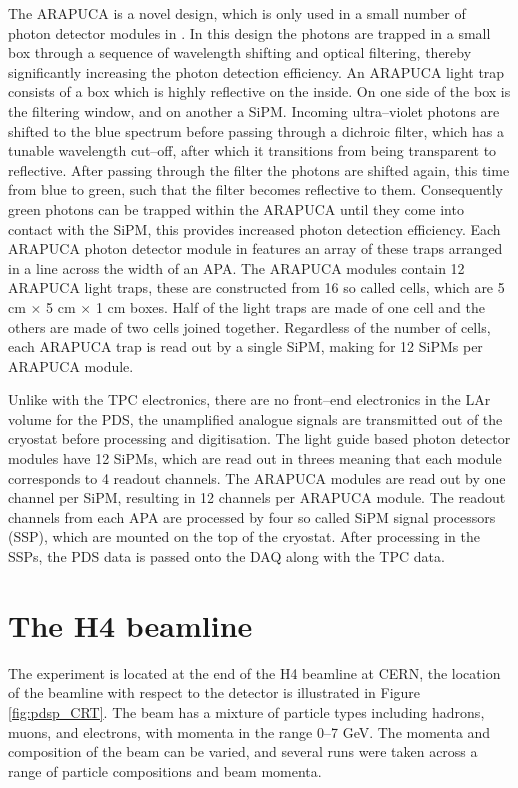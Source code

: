 The ARAPUCA is a novel design, which is only used in a small number of photon 
detector modules in \protodune{}. In this design the photons are trapped in a 
small box through a sequence of wavelength shifting and optical filtering, 
thereby significantly increasing the photon detection 
efficiency\cite{Segreto:2018jdx}. An ARAPUCA light trap consists of a box 
which is highly reflective on the inside. On one side of the box is the 
filtering window, and on another a SiPM. Incoming ultra--violet photons are 
shifted to the blue spectrum before passing through a dichroic filter, which 
has a tunable wavelength cut--off, after which it transitions from being 
transparent to reflective. After passing through the filter the photons are 
shifted again, this time from blue to green, such that the filter becomes 
reflective to them. Consequently green photons can be trapped within the 
ARAPUCA until they come into contact with the SiPM, this provides increased 
photon detection efficiency. Each ARAPUCA photon detector module in 
\protodune{} features an array of these traps arranged in a line across the 
width of an APA. The ARAPUCA modules contain 12 ARAPUCA light traps, these are 
constructed from 16 so called cells, which are 5 cm $\times$ 5 cm $\times$ 1 
cm boxes. Half of the light traps are made of one cell and the others are made 
of two cells joined together. Regardless of the number of cells, each ARAPUCA 
trap is read out by a single SiPM, making for 12 SiPMs per ARAPUCA module.

Unlike with the TPC electronics, there are no front--end electronics in the LAr
volume for the PDS, the unamplified analogue signals are transmitted out of the
cryostat before processing and digitisation. The light guide based photon 
detector modules have 12 SiPMs, which are read out in threes meaning that each 
module corresponds to 4 readout channels. The ARAPUCA modules are read out by
one channel per SiPM, resulting in 12 channels per ARAPUCA module. The readout 
channels from each APA are processed by four so called SiPM signal processors 
(SSP), which are mounted on the top of the cryostat. After processing in the 
SSPs, the PDS data is passed onto the DAQ along with the TPC data.

\section{The H4 beamline} \label{sec:h4}

The \protodune{} experiment is located at the end of the H4 beamline at CERN,
the location of the beamline with respect to the detector is illustrated in
Figure \ref{fig:pdsp_CRT}. The beam has a mixture of particle types including
hadrons, muons, and electrons, with momenta in the range 0--7 GeV. The momenta
and composition of the beam can be varied, and several runs were taken across a 
range of particle compositions and beam momenta.

